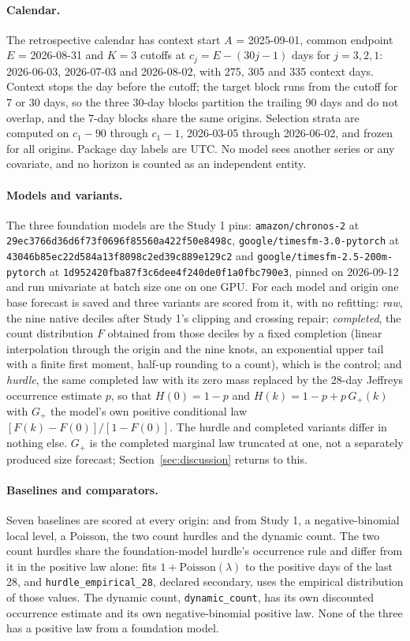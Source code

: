 \paragraph{Calendar.} The retrospective calendar has context start $A$ = 2025-09-01, common endpoint $E$ =
2026-08-31 and $K = 3$ cutoffs at $c_j = E - (30j - 1)$ days for $j = 3, 2, 1$: 2026-06-03, 2026-07-03 and
2026-08-02, with 275, 305 and 335 context days. Context stops the day before the cutoff; the target block
runs from the cutoff for 7 or 30 days, so the three 30-day blocks partition the trailing 90 days and do not
overlap, and the 7-day blocks share the same origins. Selection strata are computed on $c_1 - 90$ through
$c_1 - 1$, 2026-03-05 through 2026-06-02, and frozen for all origins. Package day labels are UTC. No model
sees another series or any covariate, and no horizon is counted as an independent entity.

\paragraph{Models and variants.} The three foundation models are the Study 1 pins: \texttt{amazon/chronos-2}
at \texttt{29ec3766d36d6f73f0696f85560a422f50e8498c}, \texttt{google/timesfm-3.0-pytorch} at
\texttt{43046b85ec22d584a13f8098c2ed39c889e129c2} and \texttt{google/timesfm-2.5-200m-pytorch} at
\texttt{1d952420fba87f3c6dee4f240de0f1a0fbc790e3}, pinned on 2026-09-12 and run univariate at batch size one
on one GPU. For each model and origin one base forecast is saved and three variants are scored from it, with
no refitting: \emph{raw}, the nine native deciles after Study 1's clipping and crossing repair; \emph{completed},
the count distribution $F$ obtained from those deciles by a fixed completion (linear interpolation through
the origin and the nine knots, an exponential upper tail with a finite first moment, half-up rounding to a
count), which is the control; and \emph{hurdle}, the same completed law with its zero mass replaced by the
28-day Jeffreys occurrence estimate $p$, so that $H(0) = 1 - p$ and $H(k) = 1 - p + p\, G_+(k)$ with $G_+$
the model's own positive conditional law $[F(k) - F(0)] / [1 - F(0)]$. The hurdle and completed variants
differ in nothing else. $G_+$ is the completed marginal law truncated at one, not a separately produced size
forecast; Section~\ref{sec:discussion} returns to this.

\paragraph{Baselines and comparators.} Seven baselines are scored at every origin: \lm{} and \aets{} from
Study 1, a negative-binomial local level, a Poisson, the two count hurdles and the dynamic count. The two
count hurdles share the foundation-model hurdle's occurrence rule and differ from it in the positive law
alone: \hc{} fits $1 + \text{Poisson}(\lambda)$ to the positive days of the last 28, and
\texttt{hurdle\_empirical\_28}, declared secondary, uses the empirical distribution of those values. The
dynamic count, \texttt{dynamic\_count}, has its own discounted occurrence estimate and its own
negative-binomial positive law. None of the three has a positive law from a foundation model.

